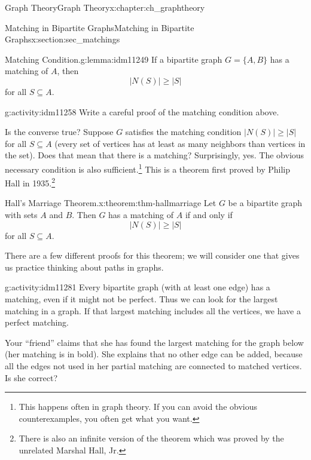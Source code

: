\documentclass[oneside,10pt,]{book}
\numberwithin{equation}{chapter}
\begin{document}
\begin{chapterptx}{Graph Theory}{}{Graph Theory}{}{}{x:chapter:ch_graphtheory}
\begin{sectionptx}{Matching in Bipartite Graphs}{}{Matching in Bipartite Graphs}{}{}{x:section:sec_matchings}
\begin{lemma}{Matching Condition.}{}{g:lemma:idm11249}%
 If a bipartite graph \(G = \{A, B\}\) has a matching of \(A\), then%
\begin{equation*}
|N(S)| \ge |S|
\end{equation*}
for all \(S \subseteq A\).%
\end{lemma}
\begin{activity}{}{g:activity:idm11258}%
Write a careful proof of the matching condition above.%
\end{activity}
Is the converse true? Suppose \(G\) satisfies the matching condition \(|N(S)| \ge |S|\) for all \(S \subseteq A\) (every set of vertices has at least as many neighbors than vertices in the set). Does that mean that there is a matching? Surprisingly, yes. The obvious necessary condition is also sufficient.\footnote{This happens often in graph theory.  If you can avoid the obvious counterexamples, you often get what you want.\label{g:fn:idm11265}} This is a theorem first proved by Philip Hall in 1935.\footnote{There is also an infinite version of the theorem which was proved by the unrelated Marshal Hall, Jr.\label{g:fn:idm11266}}%
\begin{theorem}{Hall's Marriage Theorem.}{}{x:theorem:thm-hallmarriage}%
 Let \(G\) be a bipartite graph with sets \(A\) and \(B\). Then \(G\) has a matching of \(A\) if and only if%
\begin{equation*}
|N(S)| \ge |S|
\end{equation*}
for all \(S \subseteq A\).%
\end{theorem}
There are a few different proofs for this theorem; we will consider one that gives us practice thinking about paths in graphs.%
\begin{activity}{}{g:activity:idm11281}%
Every bipartite graph (with at least one edge) has a matching, even if it might not be perfect.  Thus we can look for the largest matching in a graph.  If that largest matching includes all the vertices, we have a perfect matching.%
\par
Your ``friend'' claims that she has found the largest matching for the graph below (her matching is in bold). She explains that no other edge can be added, because all the edges not used in her partial matching are connected to matched vertices. Is she correct?%
\begin{sidebyside}{1}{0.3}{0.3}{0}%
\begin{sbspanel}{0.4}%
\resizebox{\linewidth}{!}{%
}
\end{sbspanel}
\end{sidebyside}
\end{activity}
\end{sectionptx}
\end{chapterptx}
\end{document}
